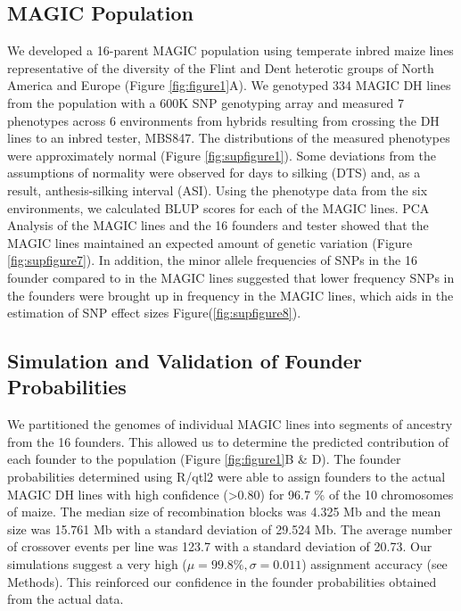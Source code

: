 \documentclass[article,9pt,twocolumn,twoside]{rilabRxiv}
\begin{document}
\subsection{MAGIC Population}

We developed a 16-parent MAGIC population using temperate inbred maize lines representative of the diversity of the Flint and Dent heterotic groups of North America and Europe (Figure \ref{fig:figure1}A).
We genotyped 334 MAGIC DH lines from the population with a 600K SNP genotyping array and measured 7 phenotypes across 6 environments from hybrids resulting from crossing the DH lines to an inbred tester, MBS847.
The distributions of the measured phenotypes were approximately normal (Figure \ref{fig:supfigure1}).
Some deviations from the assumptions of normality were observed for days to silking (DTS) and, as a result, anthesis-silking interval (ASI).
Using the phenotype data from the six environments, we calculated BLUP scores for each of the MAGIC lines.
PCA Analysis of the MAGIC lines and the 16 founders and tester showed that the MAGIC lines maintained an expected amount of genetic variation (Figure \ref{fig:supfigure7}).
In addition, the minor allele frequencies of SNPs in the 16 founder compared to in the MAGIC lines suggested that lower frequency SNPs in the founders were brought up in frequency in the MAGIC lines, which aids in the estimation of SNP effect sizes Figure(\ref{fig:supfigure8}).

\subsection{Simulation and Validation of Founder Probabilities}

We partitioned the genomes of individual MAGIC lines into segments of ancestry from the 16 founders.
This allowed us to determine the predicted contribution of each founder to the population (Figure \ref{fig:figure1}B \& D).
The founder probabilities determined using R/qtl2 were able to assign founders to the actual MAGIC DH lines with high confidence (>0.80) for  96.7 \% of the 10 chromosomes of maize.
The median size of recombination blocks was 4.325 Mb and the mean size was 15.761 Mb with a standard deviation of 29.524 Mb.
The average number of crossover events per line was 123.7 with a standard deviation of 20.73.
Our simulations suggest a very high ($\mu = 99.8\%, \sigma =0.011$) assignment accuracy (see Methods).
This reinforced our confidence in the founder probabilities obtained from the actual data.
\end{document}
